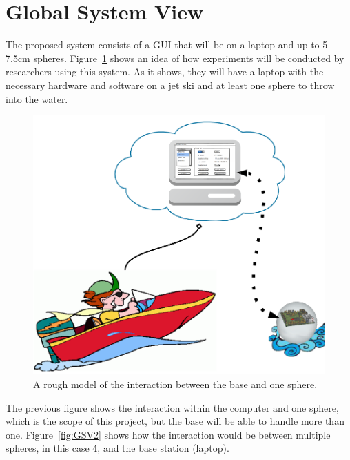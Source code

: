 \section{Global System View}

The proposed system consists of a GUI that will be on a laptop and up to 5 7.5cm spheres.  Figure~\ref{fig:GSV1} shows an idea of how experiments will be conducted by researchers using this system.  As it shows, they will have a laptop with the necessary hardware and software on a jet ski and at least one sphere to throw into the water.

\begin{figure}[H]
	\centering
	\includegraphics[scale=0.5]{img/GSV1}
	\caption{A rough model of the interaction between the base and one sphere. \label{fig:GSV1}}
\end{figure}

The previous figure shows the interaction within the computer and one sphere, which is the scope of this project, but the base will be able to handle more than one.  Figure~\ref{fig:GSV2} shows how the interaction would be between multiple spheres, in this case 4, and the base station (laptop).

